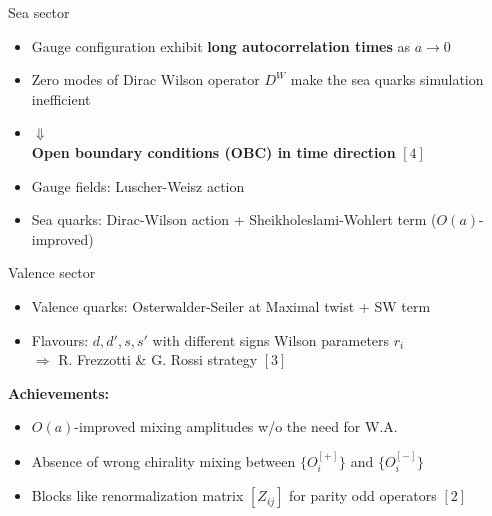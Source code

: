 \documentclass{beamer}
\begin{document}
\begin{frame}{Sea sector}
      \begin{itemize}%
            \item Gauge configuration exhibit {\bf long autocorrelation times} as $a\rightarrow 0$
            \item Zero modes of Dirac Wilson operator $D^W$ make the sea quarks simulation inefficient 
            \item[]\begin{center}
                  $\Downarrow$\\
                  {\bf Open boundary conditions (OBC) in time direction} $[4]$
                  \end{center}\vspace{\baselineskip}
            \item Gauge fields: Luscher-Weisz action
            \item Sea quarks: Dirac-Wilson action + Sheikholeslami-Wohlert term ($O(a)$-improved)
      \end{itemize}
\end{frame}

\begin{frame}{Valence sector}
      \begin{itemize}
            \item Valence quarks: Osterwalder-Seiler at Maximal twist + SW term
            \item Flavours: $d,d',s,s'$ with different signs Wilson parameters $r_i$
            \\ $\Longrightarrow$ R. Frezzotti \& G. Rossi strategy $[3]$
      \end{itemize}
      \vspace{\baselineskip}
      {\bf Achievements:}
      \begin{itemize}%
            \item $O(a)$-improved mixing amplitudes w/o the need for W.A.
            \item Absence of wrong chirality mixing between $\{O_i^{[+]}\}$ and $\{O_i^{[-]}\}$
            \item Blocks like renormalization matrix $[Z_{ij}]$ for parity odd operators $[2]$
      \end{itemize}
\end{frame}
\end{document}
